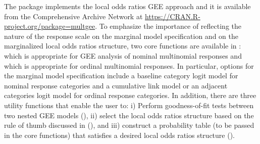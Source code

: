 \documentclass[article,shortnames,nojss]{jss}
\begin{document}
The  \citep{RCoreTeam2013} package  implements the local odds ratios GEE approach and it is available from the Comprehensive  Archive Network at \url{https://CRAN.R-project.org/package=multgee}. To emphasize the importance of reflecting the nature of the response scale on the marginal model specification and on the marginalized local odds ratios structure, two core functions are available in :  which is appropriate for GEE analysis of nominal multinomial responses and  which is appropriate for ordinal multinomial responses. In particular, options for the marginal model specification include a baseline category logit model for nominal response categories and a cumulative link model or an adjacent categories logit model for ordinal response categories. In addition, there are three utility functions that enable the user to: i) Perform goodness-of-fit tests between two nested GEE models (), ii) select the local odds ratios structure based on the rule of thumb discussed in \cite{Touloumis2012} (), and iii) construct a probability table (to be passed in the core functions) that satisfies a desired local odds ratios structure ().
\end{document}
